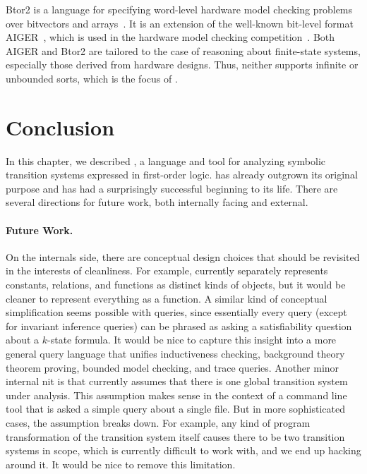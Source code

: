 Btor2 is a language for specifying word-level hardware model checking problems
over bitvectors and arrays~\cite{btor2}.
%
It is an extension of the well-known bit-level format AIGER~\cite{aiger-1.9},
which is used in the hardware model checking competition~\cite{hwmcc20}.
%
Both AIGER and Btor2 are tailored to the case of reasoning
about finite-state systems, especially those derived from hardware designs.
%
Thus, neither supports infinite or unbounded sorts,
which is the focus of \mypyvy.

\section{Conclusion}

In this chapter, we described \mypyvy, a language and tool
  for analyzing symbolic transition systems expressed in first-order logic.
\mypyvy has already outgrown its original purpose
  and has had a surprisingly successful beginning to its life.
There are several directions for future work, both internally facing and external.

\paragraph{Future Work.}

On the internals side, there are conceptual design choices
  that should be revisited in the interests of cleanliness.
For example, \mypyvy currently separately represents constants, relations, and functions
  as distinct kinds of objects,
  but it would be cleaner to represent everything as a function.
A similar kind of conceptual simplification seems possible with queries,
  since essentially every query (except for invariant inference queries)
  can be phrased as asking a satisfiability question about a $k$-state formula.
It would be nice to capture this insight into a more general query language
  that unifies inductiveness checking, background theory theorem proving,
  bounded model checking, and trace queries.
Another minor internal nit is that \mypyvy currently assumes
  that there is one global transition system under analysis.
This assumption makes sense in the context of a command line tool
  that is asked a simple query about a single file.
But in more sophisticated cases, the assumption breaks down.
For example, any kind of program transformation of the transition system itself
  causes there to be two transition systems in scope,
  which is currently difficult to work with, and we end up hacking around it.
It would be nice to remove this limitation.

